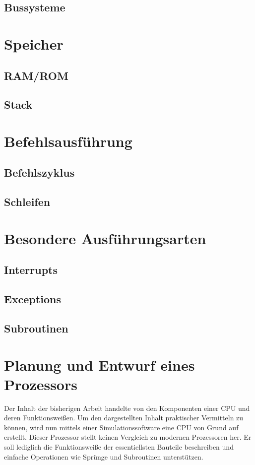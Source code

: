 \documentclass[12pt]{article}
\begin{document}
\subsection{Bussysteme}

\section{Speicher}

\subsection{RAM/ROM}
\subsection{Stack}

\section{Befehlsausführung}
\subsection{Befehlszyklus}
\subsection{Schleifen}

\section{Besondere Ausführungsarten}
\subsection{Interrupts}
\subsection{Exceptions}
\subsection{Subroutinen}

\newpage

\section{Planung und Entwurf eines Prozessors}
Der Inhalt der bisherigen Arbeit handelte von den Komponenten einer CPU und deren Funktionsweißen. Um den dargestellten Inhalt praktischer Vermitteln zu können, wird nun mittels einer Simulationssoftware eine CPU von Grund auf erstellt. Dieser Prozessor stellt keinen Vergleich zu modernen Prozessoren her. Er soll lediglich die Funktionsweiße der essentiellsten Bauteile beschreiben und einfache Operationen wie Sprünge und Subroutinen unterstützen.
\end{document}
